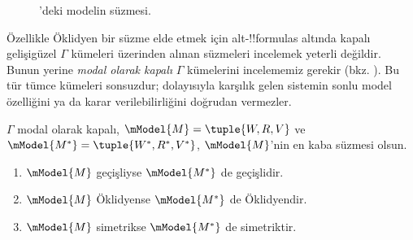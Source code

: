 \begin{figure}[ht]
  \centering
  \caption{'deki modelin süzmesi.}
\end{figure}

Özellikle Öklidyen bir süzme elde etmek için alt-!!{formula}s altında kapalı
gelişigüzel $\Gamma$ kümeleri üzerinden alınan süzmeleri incelemek yeterli
değildir. Bunun yerine \emph{modal olarak kapalı} $\Gamma$ kümelerini
incelememiz gerekir (bkz. ). Bu tür tümce
kümeleri sonsuzdur; dolayısıyla karşılık gelen sistemin sonlu model
özelliğini ya da karar verilebilirliğini doğrudan vermezler.

\begin{thm}
  $\Gamma$ modal olarak kapalı,
  $\mModel{M}=\tuple{W,R,V}$ ve
  $\mModel{M^*}=\tuple{W^*,R^*,V^*}$, $\mModel{M}$'nin en kaba süzmesi
  olsun.
  \begin{enumerate}
  \item $\mModel{M}$ geçişliyse $\mModel{M^*}$ de geçişlidir.
  \item $\mModel{M}$ Öklidyense $\mModel{M^*}$ de Öklidyendir.
  \item $\mModel{M}$ simetrikse $\mModel{M^*}$ de simetriktir.
  \end{enumerate}
\end{thm}

